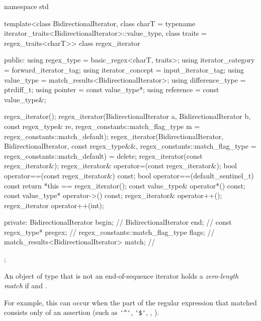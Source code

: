 \begin{codeblock}
namespace std {
  template<class BidirectionalIterator,
            class charT = typename iterator_traits<BidirectionalIterator>::value_type,
            class traits = regex_traits<charT>>
    class regex_iterator {
    public:
      using regex_type        = basic_regex<charT, traits>;
      using iterator_category = forward_iterator_tag;
      using iterator_concept  = input_iterator_tag;
      using value_type        = match_results<BidirectionalIterator>;
      using difference_type   = ptrdiff_t;
      using pointer           = const value_type*;
      using reference         = const value_type&;

      regex_iterator();
      regex_iterator(BidirectionalIterator a, BidirectionalIterator b,
                     const regex_type& re,
                     regex_constants::match_flag_type m = regex_constants::match_default);
      regex_iterator(BidirectionalIterator, BidirectionalIterator,
                     const regex_type&&,
                     regex_constants::match_flag_type = regex_constants::match_default) = delete;
      regex_iterator(const regex_iterator&);
      regex_iterator& operator=(const regex_iterator&);
      bool operator==(const regex_iterator&) const;
      bool operator==(default_sentinel_t) const { return *this == regex_iterator(); }
      const value_type& operator*() const;
      const value_type* operator->() const;
      regex_iterator& operator++();
      regex_iterator operator++(int);

    private:
      BidirectionalIterator                begin;               // \expos
      BidirectionalIterator                end;                 // \expos
      const regex_type*                    pregex;              // \expos
      regex_constants::match_flag_type     flags;               // \expos
      match_results<BidirectionalIterator> match;               // \expos
    };
}
\end{codeblock}

\pnum
An object of type  that is not an end-of-sequence iterator
holds a \textit{zero-length match} if  and
.
\begin{note}
For
example, this can occur when the part of the regular expression that
matched consists only of an assertion (such as \verb|'^'|, \verb|'$'|,
, ).
\end{note}

